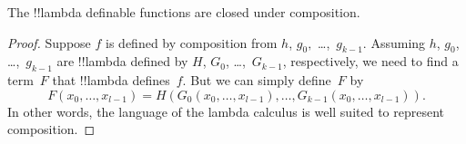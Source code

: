 \documentclass[../../../include/open-logic-section]{subfiles}
\begin{document}

\begin{lem}
The !!{lambda definable} functions are closed under composition.
\end{lem}

\begin{proof}
Suppose $f$ is defined by composition from $h$, $g_0,$
\dots,~$g_{k-1}$. Assuming $h$, $g_0$, \dots,~$g_{k-1}$ are
!!{lambda defined} by $H$, $G_0$, \dots,~$G_{k-1}$,
respectively, we need to find a term~$F$ that !!{lambda define}s~$f$. But we
can simply define~$F$ by
\[
F(x_0, \dots, x_{l-1}) = H(G_0(x_0, \dots, x_{l-1}),
\dots, G_{k-1}(x_0, \dots, x_{l-1})).
\]
In other words, the language of the lambda calculus is well suited to
represent composition.
\end{proof}
\end{document}
